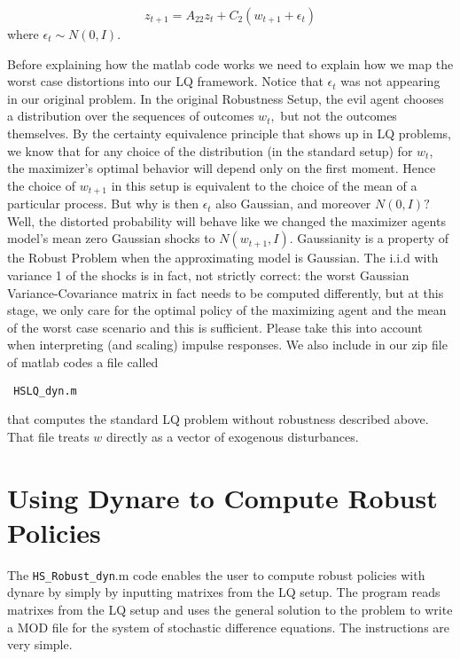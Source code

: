 \documentclass[letter, fleqn, 11pt]{article}
\begin{document}
\begin{equation*}
z_{t+1}=A_{22}z_{t}+C_{2}\left( w_{t+1}+\epsilon _{t}\right)
\end{equation*}%
where $\epsilon _{t}\sim N\left( 0,I\right) .$

Before explaining how the matlab code works we need to explain how we map the worst case distortions into our LQ framework. Notice that $\epsilon _{t}$ was not appearing in our original
problem. In the original Robustness Setup, the evil agent chooses a distribution over the sequences of outcomes $w_{t},$ but not the outcomes
themselves. %
By the certainty equivalence principle that shows up in LQ problems, we know that
for any choice of the distribution (in the standard setup) for $w_{t}$, the maximizer's optimal behavior will depend only on the first moment.
Hence the choice of $w_{t+1}$ in this setup is equivalent to the choice of the mean of a particular
process. But why is then $\epsilon _{t}$ also Gaussian, and moreover $%
N\left( 0,I\right) ?$ Well, the distorted probability will behave like we
changed the maximizer agents model's mean zero Gaussian shocks to $N\left(
w_{t+1},I\right) $. Gaussianity is a property of the Robust Problem when
the approximating model is Gaussian. The i.i.d with variance 1 of the shocks
is in fact, not strictly correct: the worst Gaussian Variance-Covariance
matrix in fact needs to be computed differently, but at this stage, we only
care for the optimal policy of the maximizing agent and the mean of the
worst case scenario and this is sufficient. Please take this into account when interpreting (and scaling) impulse responses. %
We also include in our zip file of matlab codes a file called \begin{verbatim} HSLQ_dyn.m \end{verbatim} that computes the standard LQ problem without robustness described above. That file treats $w$ directly as a vector of exogenous disturbances. 
\newpage

\section{Using Dynare to Compute Robust Policies}

The \texttt{HS\_Robust\_dyn}.m code enables the user to compute robust policies with dynare by simply by inputting matrixes from the LQ setup.
The program reads matrixes from the LQ setup and uses the general solution to the problem to write a MOD file for the system of stochastic
difference equations. The instructions are very simple.
\end{document}
